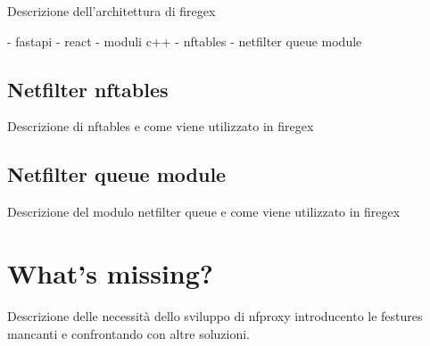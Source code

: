 Descrizione dell'architettura di firegex

- fastapi
- react \cite{react_website}
- moduli c++
- nftables
- netfilter queue module

\subsection{Netfilter nftables}

Descrizione di nftables e come viene utilizzato in firegex

\subsection{Netfilter queue module}

Descrizione del modulo netfilter queue e come viene utilizzato in firegex

\section{What's missing?}

Descrizione delle necessità dello sviluppo di nfproxy introducento le festures mancanti
e confrontando con altre soluzioni.
